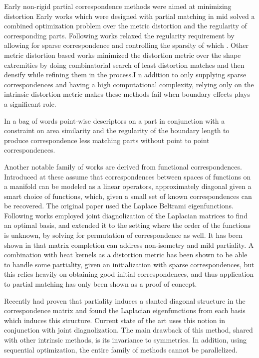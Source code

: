 \documentclass[10pt,twocolumn,letterpaper]{article}
\begin{document}
Early non-rigid partial correspondence methods were aimed at minimizing distortion
Early works which were designed with partial matching in mid\cite{bronstein2008not,bronstein2009partial} solved a combined optimization problem over the metric distortion and the regularity of corresponding parts. Following works relaxed the regularity requirement by allowing for sparse correspondence\cite{Torsello:2012:GAD:2354409.2354702} and controlling the sparsity of which \cite{rodola2013elastic}. Other metric distortion based works\cite{sahilliouglu2012scale,sahilliouglu2014multiple} minimized the distortion metric over the shape extremities by doing combinatorial search of least distortion matches and then densify while refining them in the process.I n addition to only supplying sparse correspondences and having a high computational complexity, relying only on the intrinsic distortion metric makes these methods fail when boundary effects plays a significant role.

In\cite{pokrass2013partial} a bag of words point-wise descriptors on a part in conjunction with a constraint on area similarity and the regularity of the boundary length to produce correspondence less matching parts without point to point correspondences.

Another notable family of works are derived from functional correspondences. Introduced at\cite{Ovsjanikov:2012:FMF:2185520.2185526} these assume that correspondences between spaces of functions on a manifold can be modeled as a linear operators, approximately diagonal given a smart choice of functions, which, given a small set of known correspondences can be recovered. The original paper used the Laplace Beltrami eigenfunctions. Following works employed joint diagnolization of the Laplacian matrices to find an optimal basis, and\cite{pokrass2013sparse} extended it to the setting where the order of the functions is unknown, by solving for permutation of correspondence as well. It has been shown in \cite{kovnatsky2015functional} that matrix completion can address non-isometry and mild partiality. A combination with heat kernels as a distortion metric\cite{vestner2017efficient} has been shown to be able to handle some partiality, given an initialization with sparse correspondences, but this relies heavily on obtaining good initial correspondences, and thus application to partial matching has only been shown as a proof of concept.

Recently \cite{rodola2017partial} had proven that partiality induces a slanted diagonal structure in the correspondence matrix and found the Laplacian eigenfunctions from each basis which induces this structure. Current state of the art\cite{litany2017fully} uses this notion in conjunction with joint diagnolization. The main drawback of this method, shared with other intrinsic methods, is its invariance to symmetries. In addition, using sequential optimization, the entire family of methods cannot be parallelized. 
\end{document}
